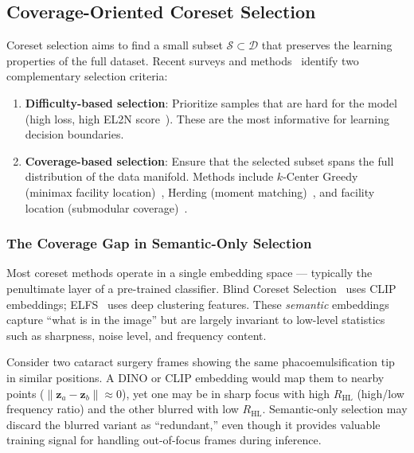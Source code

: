\subsection{Coverage-Oriented Coreset Selection}
\label{sec:coreset_coverage}

Coreset selection aims to find a small subset $\mathcal{S} \subset \mathcal{D}$
that preserves the learning properties of the full dataset.  Recent surveys
and methods~\cite{coreset_survey2025} identify two complementary selection
criteria:

\begin{enumerate}
    \item \textbf{Difficulty-based selection}: Prioritize samples that are
          hard for the model (high loss, high EL2N
          score~\cite{paul2021deep}).  These are the most informative for
          learning decision boundaries.

    \item \textbf{Coverage-based selection}: Ensure that the selected subset
          spans the full distribution of the data manifold.  Methods include
          $k$-Center Greedy (minimax facility
          location)~\cite{coreset_survey2025}, Herding (moment
          matching)~\cite{welling2009herding}, and facility location
          (submodular coverage)~\cite{facility_location}.
\end{enumerate}

\subsubsection{The Coverage Gap in Semantic-Only Selection}

Most coreset methods operate in a single embedding space --- typically the
penultimate layer of a pre-trained classifier.  Blind Coreset
Selection~\cite{blindcs2025} uses CLIP embeddings; ELFS~\cite{elfs2025}
uses deep clustering features.  These \emph{semantic} embeddings capture
``what is in the image'' but are largely invariant to low-level statistics
such as sharpness, noise level, and frequency content.

Consider two cataract surgery frames showing the same phacoemulsification
tip in similar positions.  A DINO or CLIP embedding would map them to
nearby points ($\|\mathbf{z}_a - \mathbf{z}_b\| \approx 0$), yet one may
be in sharp focus with high $R_{\text{HL}}$ (high/low frequency ratio) and
the other blurred with low $R_{\text{HL}}$.  Semantic-only selection may
discard the blurred variant as ``redundant,'' even though it provides
valuable training signal for handling out-of-focus frames during inference.

